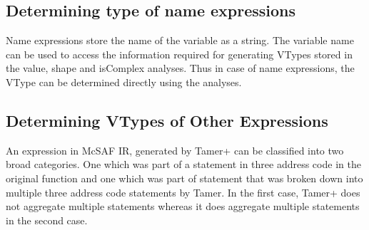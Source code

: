 \subsection{Determining type of name expressions}
Name expressions store the name of the variable as a string. The variable name can be used to access the information required for generating VTypes stored in the value, shape and isComplex analyses. Thus in case of name expressions, the VType can be determined directly using the analyses. 

\subsection{Determining VTypes of Other Expressions}
An expression in McSAF IR, generated by Tamer+ can be classified into two broad categories. One which was part of a statement in three address code in the original \matlab function and one which was part of statement that was broken down into multiple three address code statements by Tamer. In the first case, Tamer+ does not aggregate multiple statements whereas it does aggregate multiple statements in the second case.  

